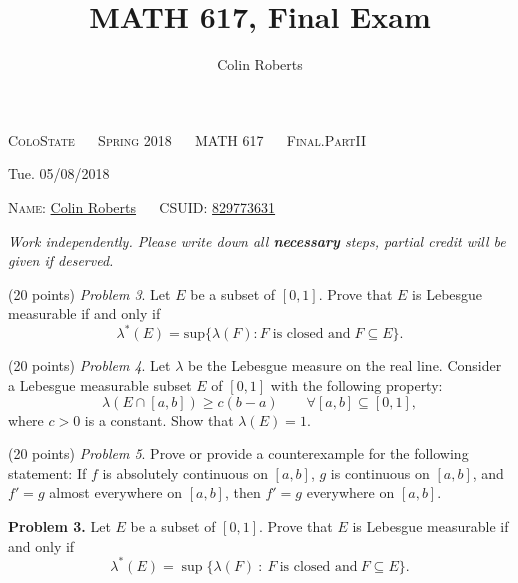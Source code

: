 \documentclass[leqno]{article}
\author{Colin Roberts}
\title{MATH 617, Final Exam}
\theoremstyle{nonumberplain}
\begin{document}
\begin{center}
  \textsc{\large ColoState ~~ Spring 2018 ~~ MATH 617 ~~ Final.PartII}
\end{center}

\begin{center}
  \textrm{Tue. 05/08/2018}
\end{center}

\vglue 0.10in

\bigskip
\noindent
\textsc{Name:} \underline{Colin Roberts\hglue 1.5in} ~~
\textsc{CSUID:} \underline{829773631\hglue 1.5in}

\vskip 0.10in
\noindent
\textit{%
Work independently.
Please write down all {\bf necessary} steps,
partial credit will be given if deserved. 
}

\large

\bigskip
\bigskip
\noindent
(20 points)
\textit{Problem 3}.
\quad
Let $ E $ be a subset of $ [0,1] $.  
Prove that $ E $ is Lebesgue measurable if and only if 
$$
  \lambda^*(E) = \mbox{sup}\{ \lambda(F): F \;\mbox{is closed and}\; F \subseteq E \}.
$$

\bigskip
\bigskip
\noindent
(20 points)
\textit{Problem 4}.
\quad
Let $ \lambda $ be the Lebesgue measure on the real line.
Consider a Lebesgue measurable subset $ E $ of $ [0,1] $
with the following property: 
$$
  \lambda(E \cap [a,b]) \ge c (b-a)
  \qquad
  \forall [a,b] \subseteq [0,1],
$$
where $ c>0 $ is a constant.  
Show that $ \lambda(E)=1 $.

\bigskip
\bigskip
\noindent
(20 points)
\textit{Problem 5}.
\quad
Prove or provide a counterexample for the following statement:
If $ f $ is absolutely continuous on $ [a,b] $,
$ g $ is continuous on $ [a,b] $,
and $ f'=g $ almost everywhere on $ [a,b] $,
then $ f'=g $ everywhere on $ [a,b] $.

\pagebreak


\noindent\textbf{Problem 3.} \quad
Let $E$ be a subset of $[0,1]$. Prove that $E$ is Lebesgue measurable if and only if
\[
\lambda^*(E)=\sup\{\lambda(F)~\colon~ F ~\textrm{is closed and}~ F\subseteq E\}.
\]
\end{document}
